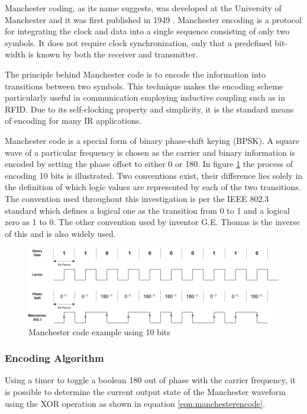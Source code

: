 Manchester coding, as its name suggests, was developed at the University of Manchester and it was first published in 1949 \cite{Jameel2019}. Manchester encoding is a protocol for integrating the clock and data into a single sequence consisting of only two symbols. It does not require clock synchronization, only that a predefined bit-width is known by both the receiver and transmitter. 

The principle behind Manchester code is to encode the information into transitions between two symbols. This technique makes the encoding scheme particularly useful in communication employing inductive coupling such as in RFID. Due to its self-clocking property and simplicity, it is the standard means of encoding for many IR applications.

Manchester code is a special form of binary phase-shift keying (BPSK). A square wave of a particular frequency is chosen as the carrier and binary information is encoded by setting the phase offset to either 0\degree{} or 180\degree{}. In figure \ref{fig:manchesterencoding} the process of encoding 10 bits is illustrated. Two conventions exist, their difference lies solely in the definition of which logic values are represented by each of the two transitions. The convention used throughout this investigation is per the IEEE 802.3 standard which defines a logical one as the transition from 0 to 1 and a logical zero as 1 to 0. The other convention used by inventor G.E. Thomas is the inverse of this and is also widely used.\\

\begin{figure}[H]
	\centering
	\includegraphics[width=0.7\linewidth]{figures/litreview/manchester_encoding}
	\caption{Manchester code example using 10 bits}
	\label{fig:manchesterencoding}
\end{figure}

\subsubsection{Encoding Algorithm}

Using a timer to toggle a boolean 180\textdegree{} out of phase with the carrier frequency, it is possible to determine the current output state of the Manchester waveform using the XOR operation as shown in equation \ref{eqn:manchesterencode}.

